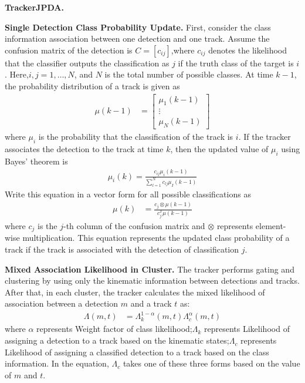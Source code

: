 \textbf{TrackerJPDA.}

\textbf{Single Detection Class Probability Update.}
First, consider the class information association between one detection and one track. 
Assume the confusion matrix of the detection is $C=\left[c_{i j}\right]$,where $c_{i j}$ denotes the likelihood that the classifier outputs the classification as $j$ if the truth class of the target is $i$.
Here,$i,j = 1,…, N$, and $N$ is the total number of possible classes.
At time $k-1$, the probability distribution of a track is given as 
\begin{align}
	\mu(k-1) & = \left[\begin{array}{l}
		\mu_{1}(k-1) \\
		\vdots \\
		\mu_{N}(k-1)
	\end{array}\right]
\end{align}
where $\mu_{i}$ is the probability that the classification of the track is $i$.
If the tracker associates the detection to the track at time $k$, then the updated value of $\mu_{i}$ using Bayes' theorem is
\begin{align}
	\mu_{i}(k) = \frac{c_{i j} \mu_{i}(k-1)}{\sum_{l = 1}^{N} c_{l j} \mu_{I}(k-1)}
\end{align}
Write this equation in a vector form for all possible classifications as
\begin{align}
	\mu(k) & = \frac{c_{j} \otimes \mu(k-1)}{c_{j}^{T} \mu(k-1)}
\end{align}
where $c_{j}$ is the $j$-th column of the confusion matrix and $\otimes$ represents element-wise multiplication. 
This equation represents the updated class probability of a track if the track is associated with the detection of classification $j$.

\textbf{Mixed Association Likelihood in Cluster.}
The tracker performs gating and clustering by using only the kinematic information between detections and tracks. 
After that, in each cluster, the tracker calculates the mixed likelihood of association between a detection $m$ and a track $t$ as:
\begin{align}
	\Lambda(m, t) & = \Lambda_{k}^{1-\alpha}(m, t) \Lambda_{c}^{\alpha}(m, t)
\end{align}
where $\alpha$ represents Weight factor of class likelihood;$\Lambda_{k}$ represents Likelihood of assigning a detection to a track based on the kinematic states;$\Lambda_{c}$ represents Likelihood of assigning a classified detection to a track based on the class information.
In the equation, $\Lambda_{c}$ takes one of these three forms based on the value of $m$ and $t$.

